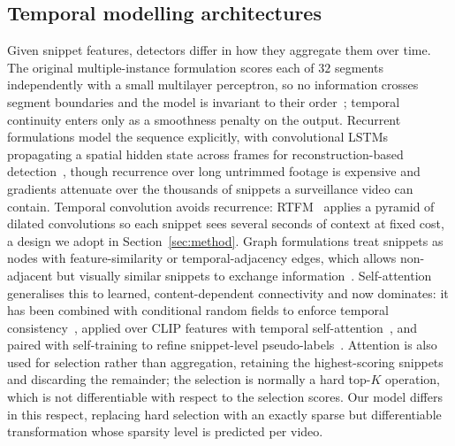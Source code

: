 \documentclass[11pt]{article}
\begin{document}
\subsection{Temporal modelling architectures}
Given snippet features, detectors differ in how they aggregate them over time.
The original multiple-instance formulation scores each of $32$ segments
independently with a small multilayer perceptron, so no information crosses
segment boundaries and the model is invariant to their order~\citep{sultani2018real};
temporal continuity enters only as a smoothness penalty on the output. Recurrent
formulations model the sequence explicitly, with convolutional
LSTMs~\citep{shi2015convolutional} propagating a spatial hidden state across
frames for reconstruction-based detection~\citep{luo2017remembering}, though
recurrence over long untrimmed footage is expensive and gradients attenuate over
the thousands of snippets a surveillance video can contain. Temporal convolution
avoids recurrence: RTFM~\citep{tian2021weakly} applies a pyramid of dilated
convolutions so each snippet sees several seconds of context at fixed cost, a
design we adopt in Section~\ref{sec:method}. Graph formulations treat snippets as
nodes with feature-similarity or temporal-adjacency edges, which allows
non-adjacent but visually similar snippets to exchange
information~\citep{zhong2019graph}. Self-attention~\citep{vaswani2017attention}
generalises this to learned, content-dependent connectivity and now dominates:
it has been combined with conditional random fields to enforce temporal
consistency~\citep{purwanto2021dance}, applied over CLIP features with temporal
self-attention~\citep{joo2023clip}, and paired with self-training to refine
snippet-level pseudo-labels~\citep{feng2021mist,lv2021localizing}. Attention is
also used for selection rather than aggregation, retaining the highest-scoring
snippets and discarding the remainder; the selection is normally a hard top-$K$
operation, which is not differentiable with respect to the selection scores. Our
model differs in this respect, replacing hard selection with an exactly sparse
but differentiable transformation whose sparsity level is predicted per video.
\end{document}
